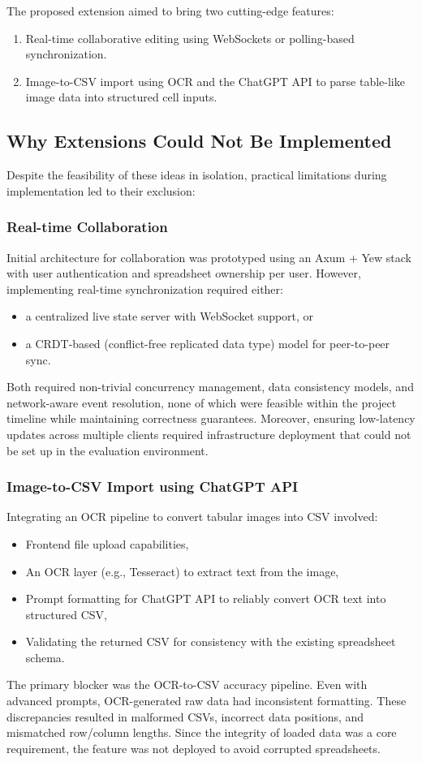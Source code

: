 \documentclass[11pt]{article}
\begin{document}
The proposed extension aimed to bring two cutting-edge features:
\begin{enumerate}
    \item Real-time collaborative editing using WebSockets or polling-based synchronization.
    \item Image-to-CSV import using OCR and the ChatGPT API to parse table-like image data into structured cell inputs.
\end{enumerate}

\subsection{Why Extensions Could Not Be Implemented}

Despite the feasibility of these ideas in isolation, practical limitations during implementation led to their exclusion:

\subsubsection*{Real-time Collaboration}
Initial architecture for collaboration was prototyped using an Axum + Yew stack with user authentication and spreadsheet ownership per user. However, implementing real-time synchronization required either:
\begin{itemize}
    \item a centralized live state server with WebSocket support, or
    \item a CRDT-based (conflict-free replicated data type) model for peer-to-peer sync.
\end{itemize}
Both required non-trivial concurrency management, data consistency models, and network-aware event resolution, none of which were feasible within the project timeline while maintaining correctness guarantees. Moreover, ensuring low-latency updates across multiple clients required infrastructure deployment that could not be set up in the evaluation environment.

\subsubsection*{Image-to-CSV Import using ChatGPT API}
Integrating an OCR pipeline to convert tabular images into CSV involved:
\begin{itemize}
    \item Frontend file upload capabilities,
    \item An OCR layer (e.g., Tesseract) to extract text from the image,
    \item Prompt formatting for ChatGPT API to reliably convert OCR text into structured CSV,
    \item Validating the returned CSV for consistency with the existing spreadsheet schema.
\end{itemize}
The primary blocker was the OCR-to-CSV accuracy pipeline. Even with advanced prompts, OCR-generated raw data had inconsistent formatting. These discrepancies resulted in malformed CSVs, incorrect data positions, and mismatched row/column lengths. Since the integrity of loaded data was a core requirement, the feature was not deployed to avoid corrupted spreadsheets.
\end{document}
